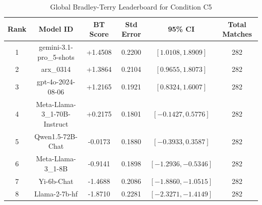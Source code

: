 \begin{table}[ht]
\centering
\caption{Global Bradley-Terry Leaderboard for Condition \textsc{C5}}
\label{tab:leaderboard_c5}
\begin{tabular}{cccccc}
\hline
\textbf{Rank} & \textbf{Model ID} & \textbf{BT Score} & \textbf{Std Error} & \textbf{95\% CI} & \textbf{Total Matches} \\
\hline
1 & gemini-3.1-pro\_5-shots & +1.4508 & 0.2200 & $[1.0108, 1.8909]$ & 282 \\
2 & arx\_0314 & +1.3864 & 0.2104 & $[0.9655, 1.8073]$ & 282 \\
3 & gpt-4o-2024-08-06 & +1.2165 & 0.1921 & $[0.8324, 1.6007]$ & 282 \\
4 & Meta-Llama-3\_1-70B-Instruct & +0.2175 & 0.1801 & $[-0.1427, 0.5776]$ & 282 \\
5 & Qwen1.5-72B-Chat & -0.0173 & 0.1880 & $[-0.3933, 0.3587]$ & 282 \\
6 & Meta-Llama-3\_1-8B & -0.9141 & 0.1898 & $[-1.2936, -0.5346]$ & 282 \\
7 & Yi-6b-Chat & -1.4688 & 0.2086 & $[-1.8860, -1.0515]$ & 282 \\
8 & Llama-2-7b-hf & -1.8710 & 0.2281 & $[-2.3271, -1.4149]$ & 282 \\
\hline
\end{tabular}
\end{table}
